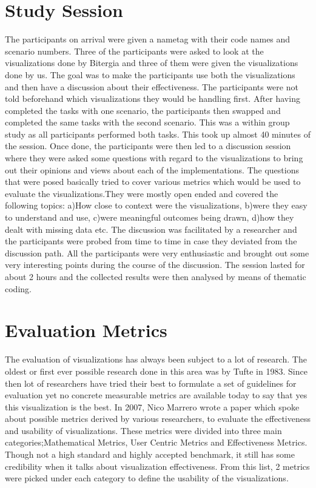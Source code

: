 \documentclass[seploa]{beavtex}
\begin{document}
\section{Study Session}
The participants on arrival were given a nametag with their code names and scenario numbers. Three of the participants were asked to look at the visualizations done by Bitergia and three of them were given the visualizations done by us. The goal was to make the participants use both the visualizations and then have a discussion about their effectiveness. The participants were not told beforehand which visualizations they would be handling first. After having completed the tasks with one scenario, the participants then swapped and completed the same tasks with the second scenario. This was a within group study as all participants performed both tasks. This took up almost 40 minutes of the session. Once done, the participants were then led to a discussion session where they were asked some questions with regard to the visualizations to bring out their opinions and views about each of the implementations. The questions that were posed basically tried to cover various metrics which would be used to evaluate the visualizations.They were mostly open ended and covered the following topics: a)How close to context were the visualizations, b)were they easy to understand and use, c)were meaningful outcomes being drawn, d)how they dealt with missing data etc. The discussion was facilitated by a researcher and the participants were probed from time to time in case they deviated from the discussion path. All the participants were very enthusiastic and brought out some very interesting points during the course of the discussion. The session lasted for about 2 hours and the collected results were then analysed by means of thematic coding.

\section{Evaluation Metrics}
The evaluation of visualizations has always been subject to a lot of research. The oldest or first ever possible research done in this area was by Tufte in 1983\cite{tufte1983}. Since then lot of researchers have tried their best to formulate a set of guidelines for evaluation yet no concrete measurable metrics are available today to say that yes this visualization is the best. In 2007, Nico Marrero wrote a paper which spoke about possible metrics derived by various researchers, to evaluate the effectiveness and usability of visualizations\cite{nico2007}. These metrics were divided into three main categories;Mathematical Metrics, User Centric Metrics and Effectiveness Metrics. Though not a high standard and highly accepted benchmark, it still has some credibility when it talks about visualization effectiveness. From this list, 2 metrics were picked under each category to define the usability of the visualizations.
\end{document}
